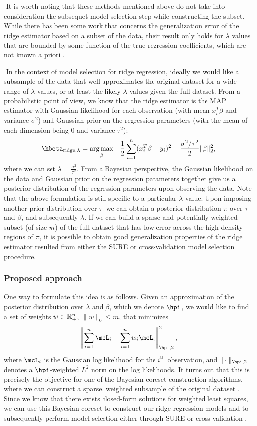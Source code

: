 $ $\newline
It is worth noting that these methods mentioned above do not take into consideration the subsequet model selection step while constructing the subset. While there has been some work that concerns the generalization error of the ridge estimator based on a subset of the data, their result only holds for $\lambda$ values that are bounded by some function of the true regression coefficients, which are not known a priori \citep{derezinski2017subsampling}.

$ $\newline
In the context of model selection for ridge regression, ideally we would like a subsample of the data that well approximates the original dataset for a wide range of $\lambda$ values, or at least the likely $\lambda$ values given the full dataset. From a probabilistic point of view, we know that the ridge estimator is the MAP estimator with Gaussian likelihood for each observation (with mean $x_i^T\beta$ and variance $\sigma^2$) and Gaussian prior on the regression parameters (with the mean of each dimension being $0$ and variance $\tau^2$):
\[
\hbeta_{\text{ridge},\lambda} = \argmax_{\beta} -\frac{1}{2}\sum_{i=1}^n (x_i^T\beta - y_i)^2 - \frac{\sigma^2 / \tau^2}{2}\|\beta\|_2^2,
\]
where we can set $\lambda = \frac{\sigma^2}{\tau^2}$. From a Bayesian perspective, the Gaussian likelihood on the data and Gaussian prior on the regression parameters together give us a posterior distribution of the regression parameters upon observing the data. Note that the above formulation is still specific to a particular $\lambda$ value. Upon imposing another prior distribution over $\tau$, we can obtain a posterior distribution $\pi$ over $\tau$ and $\beta$, and subsequently $\lambda$. If we can build a sparse and potentially weighted subset (of size $m$) of the full dataset that has low error across the high density regions of $\pi$, it is possible to obtain good generalization properties of the ridge estimator resulted from either the SURE or cross-validation model selection procedure.

\subsubsection{Proposed approach}
One way to formulate this idea is as follows. Given an approximation of the posterior distribution over $\lambda$ and $\beta$, which we denote $\hpi$, we would like to find a set of weights $w \in\mathbb{R}_+^n$, $\|w\|_0 \leq m$, that minimizes
\[
\left\| \sum_{i=1}^n \mcL_i - \sum_{i=1}^n w_i \mcL_i \right\|_{\hpi, 2}^2,
\]
where $\mcL_i$ is the Gaussian log likelihood for the $i^\text{th}$ observation, and $\|\cdot\|_{\hpi, 2}$ denotes a $\hpi$-weighted $L^2$ norm on the log likelihoods. It turns out that this is precisely the objective for one of the Bayesian coreset construction algorithms, where we can construct a sparse, weighted subsample of the original dataset \citep{campbell2019automated}. Since we know that there exists closed-form solutions for weighted least squares, we can use this Bayesian coreset to construct our ridge regression models and to subsequently perform model selection either through SURE or cross-validation \citep{strutz2011data}.

